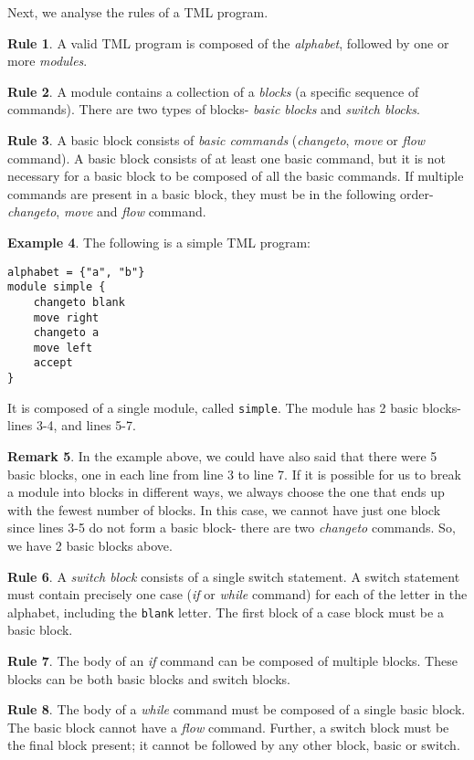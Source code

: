 \documentclass{article}
\theoremstyle{definition}
\newtheorem{rules}{Rule}[section]
\newtheorem{remark}[rules]{Remark}
\newtheorem{example}[rules]{Example}
\begin{document}
    Next, we analyse the rules of a TML program.
    \begin{rules}
        A valid TML program is composed of the \emph{alphabet}, followed by one or more \emph{modules}.
    \end{rules}
    \begin{rules}
        A module contains a collection of a \emph{blocks} (a specific sequence of commands). There are two types of blocks- \emph{basic blocks} and \emph{switch blocks}.
    \end{rules}
    \begin{rules}
        A basic block consists of \emph{basic commands} (\textit{changeto}, \textit{move} or \textit{flow} command). A basic block consists of at least one basic command, but it is not necessary for a basic block to be composed of all the basic commands. If multiple commands are present in a basic block, they must be in the following order- \textit{changeto}, \textit{move} and \textit{flow} command.
    \end{rules}
    \begin{example}
        The following is a simple TML program:
\begin{lstlisting}[language=TML]
alphabet = {"a", "b"}
module simple {
    changeto blank
    move right
    changeto a
    move left
    accept
}
\end{lstlisting}
    It is composed of a single module, called \texttt{simple}. The module has 2 basic blocks- lines 3-4, and lines 5-7.
    \end{example}
    \begin{remark}
        In the example above, we could have also said that there were 5 basic blocks, one in each line from line 3 to line 7. If it is possible for us to break a module into blocks in different ways, we always choose the one that ends up with the fewest number of blocks. In this case, we cannot have just one block since lines 3-5 do not form a basic block- there are two \textit{changeto} commands. So, we have 2 basic blocks above.
    \end{remark}
    
    \begin{rules}
        A \emph{switch block} consists of a single switch statement. A switch statement must contain precisely one case (\textit{if} or \textit{while} command) for each of the letter in the alphabet, including the \texttt{blank} letter. The first block of a case block must be a basic block.
    \end{rules}
    \begin{rules}
        The body of an \textit{if} command can be composed of multiple blocks. These blocks can be both basic blocks and switch blocks.
    \end{rules}
    \begin{rules}
        The body of a \textit{while} command must be composed of a single basic block. The basic block cannot have a \textit{flow} command. Further, a switch block must be the final block present; it cannot be followed by any other block, basic or switch.
    \end{rules}
    
\end{document}
